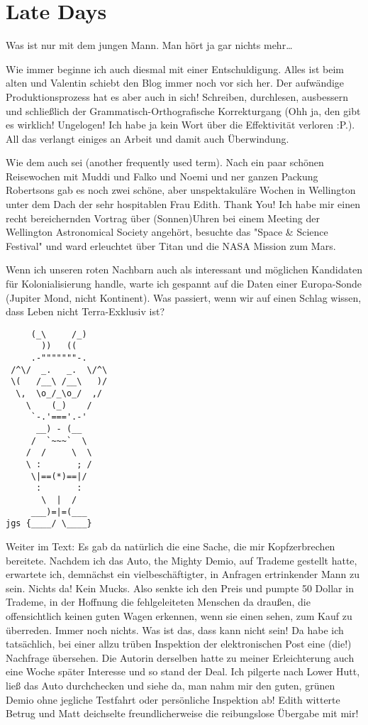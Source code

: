 \chapter{Late Days}

Was ist nur mit dem jungen Mann. Man hört ja gar nichts mehr\ldots{}

Wie immer beginne ich auch diesmal mit einer Entschuldigung. Alles ist
beim alten und Valentin schiebt den Blog immer noch vor sich her. Der
aufwändige Produktionsprozess hat es aber auch in sich! Schreiben,
durchlesen, ausbessern und schließlich der Grammatisch-Orthografische
Korrekturgang (Ohh ja, den gibt es wirklich! Ungelogen! Ich habe ja kein
Wort über die Effektivität verloren :P.). All das verlangt einiges an
Arbeit und damit auch Überwindung.

Wie dem auch sei (another frequently used term). Nach ein paar schönen
Reisewochen mit Muddi und Falko und Noemi und ner ganzen Packung
Robertsons gab es noch zwei schöne, aber unspektakuläre Wochen in
Wellington unter dem Dach der sehr hospitablen Frau Edith. Thank You!
Ich habe mir einen recht bereichernden Vortrag über (Sonnen)Uhren bei
einem Meeting der Wellington Astronomical Society angehört, besuchte das
"Space \& Science Festival" und ward erleuchtet über Titan und die NASA
Mission zum Mars.

Wenn ich unseren roten Nachbarn auch als interessant und möglichen
Kandidaten für Kolonialisierung handle, warte ich gespannt auf die Daten
einer Europa-Sonde (Jupiter Mond, nicht Kontinent). Was passiert, wenn
wir auf einen Schlag wissen, dass Leben nicht Terra-Exklusiv ist?

\begin{verbatim}
     (_\     /_)
       ))   ((
     .-"""""""-.
 /^\/  _.   _.  \/^\
 \(   /__\ /__\   )/
  \,  \o_/_\o_/  ,/
    \    (_)    /
     `-.'==='.-'
      __) - (__
     /  `~~~`  \
    /  /     \  \
    \ :       ; /
     \|==(*)==|/
      :       :
       \  |  /
     ___)=|=(___
jgs {____/ \____}
\end{verbatim}

Weiter im Text: Es gab da natürlich die eine Sache, die mir
Kopfzerbrechen bereitete. Nachdem ich das Auto, the Mighty Demio, auf
Trademe gestellt hatte, erwartete ich, demnächst ein vielbeschäftigter,
in Anfragen ertrinkender Mann zu sein. Nichts da! Kein Mucks. Also
senkte ich den Preis und pumpte 50 Dollar in Trademe, in der Hoffnung
die fehlgeleiteten Menschen da draußen, die offensichtlich keinen guten
Wagen erkennen, wenn sie einen sehen, zum Kauf zu überreden. Immer noch
nichts. Was ist das, dass kann nicht sein! Da habe ich tatsächlich, bei
einer allzu trüben Inspektion der elektronischen Post eine (die!)
Nachfrage übersehen. Die Autorin derselben hatte zu meiner Erleichterung
auch eine Woche später Interesse und so stand der Deal. Ich pilgerte
nach Lower Hutt, ließ das Auto durchchecken und siehe da, man nahm mir
den guten, grünen Demio ohne jegliche Testfahrt oder persönliche
Inspektion ab! Edith witterte Betrug und Matt deichselte
freundlicherweise die reibungslose Übergabe mit mir!

